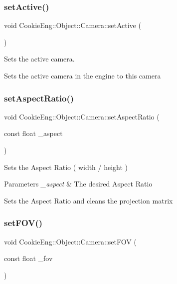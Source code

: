 \subsubsection{\texorpdfstring{set\+Active()}{setActive()}}
{\footnotesize\ttfamily void Cookie\+Eng\+::\+Object\+::\+Camera\+::set\+Active (\begin{DoxyParamCaption}{ }\end{DoxyParamCaption})\hspace{0.3cm}{\ttfamily [inline]}}



Sets the active camera. 

Sets the active camera in the engine to this camera \mbox{\label{class_cookie_eng_1_1_object_1_1_camera_a2a86235e64f591e8c812f1d69be30a94}} 
\subsubsection{\texorpdfstring{set\+Aspect\+Ratio()}{setAspectRatio()}}
{\footnotesize\ttfamily void Cookie\+Eng\+::\+Object\+::\+Camera\+::set\+Aspect\+Ratio (\begin{DoxyParamCaption}\item[{const float}]{\+\_\+aspect }\end{DoxyParamCaption})\hspace{0.3cm}{\ttfamily [inline]}}



Sets the Aspect Ratio ( width / height ) 


\begin{DoxyParams}{Parameters}
{\em \+\_\+aspect} & The desired Aspect Ratio\\
\hline
\end{DoxyParams}
Sets the Aspect Ratio and cleans the projection matrix \mbox{\label{class_cookie_eng_1_1_object_1_1_camera_aef44a3e6cef1540be7e8bcb977dddd78}} 
\subsubsection{\texorpdfstring{set\+F\+O\+V()}{setFOV()}}
{\footnotesize\ttfamily void Cookie\+Eng\+::\+Object\+::\+Camera\+::set\+F\+OV (\begin{DoxyParamCaption}\item[{const float}]{\+\_\+fov }\end{DoxyParamCaption})\hspace{0.3cm}{\ttfamily [inline]}}



